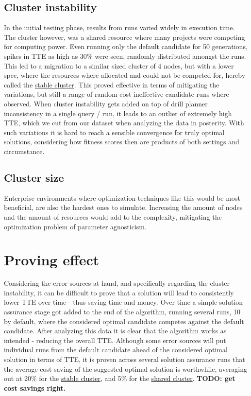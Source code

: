 \documentclass[a4paper,english]{report}
\begin{document}
		\subsection{Cluster instability}
		In the initial testing phase, results from runs varied widely in execution time. The cluster however, was a shared resource where many projects were competing for computing power. Even running only the default candidate for 50 generations, spikes in TTE as high as 30\% were seen, randomly distributed amongst the runs. This led to a migration to a similar sized cluster of 4 nodes, but with a lower spec, where the resources where allocated and could not be competed for, hereby called the \hyperref[table:cluster_stable]{stable cluster}. This proved effective in terms of mitigating the variations, but still a range of random cost-ineffective candidate runs where observed. When cluster instability gets added on top of drill planner inconsistency in a single query / run, it leads to an outlier of extremely high TTE, which we cut from our dataset when analyzing the data in posterity. With such variations it is hard to reach a sensible convergence for truly optimal solutions, considering how fitness scores then are products of both settings and circumstance.
		\subsection{Cluster size}
		Enterprise environments where optimization techniques like this would be most beneficial, are also the hardest ones to simulate. Increasing the amount of nodes and the amount of resources would add to the complexity, mitigating the optimization problem of parameter agnosticism. 
	\section{Proving effect}
	Considering the error sources at hand, and specifically regarding the cluster instability, it can be difficult to prove that a solution will lead to consistently lower TTE over time - thus saving time and money. Over time a simple solution assurance stage got added to the end of the algorithm, running several runs, 10 by default, where the considered optimal candidate competes against the default candidate. After analyzing this data it is clear that the algorithm works as intended - reducing the overall TTE. Although some error sources will put individual runs from the default candidate ahead of the considered optimal solution in terms of TTE, it is proven across several solution assurance runs that the average cost saving of the suggested optimal solution is worthwhile, averaging out at 20\% for the \hyperref[table:cluster_stable]{stable cluster}, and 5\% for the \hyperref[table:cluster_shared]{shared cluster}. \textbf{TODO: get cost savings right.}
\end{document}
